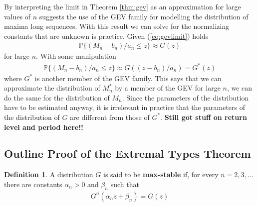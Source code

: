 \documentclass[a4paper,10pt]{article}
\theoremstyle{definition}
\newtheorem{defn}[thm]{Definition}
\numberwithin{equation}{section}
\begin{document}
By interpreting the limit in Theorem \ref{thm:gev} as an approximation for large values of $n$ suggests the use of the GEV family for modelling the distribution of maxima long sequences. With this result we can solve for the normalizing constants that are unknown is practice. Given (\ref{eq:gevlimit}) holds
\begin{align*}
\mathbb{P}\{(M_n-b_n)/a_n\leq z\} \approx G(z)
\end{align*}
for large $n$. With some manipulation 
\begin{align*}
\mathbb{P}\{(M_n-b_n)/a_n\leq z\} \approx G((z-b_n)/a_n) = G^\ast(z)
\end{align*}
where $G^\ast$ is another member of the GEV family. This says that we can approximate the distribution of $M_n^\ast$ by a member of the GEV for large $n$, we can do the same for the distribution of $M_n$. {\color{red} Since the parameters of the distribution have to be estimated anyway, it is irrelevant in practice that the parameters of the distribution of $G$ are different from those of $G^\ast$}. \textbf{Still got stuff on return level and period here!!}

\subsection{Outline Proof of the Extremal Types Theorem}

\begin{defn}
A distribution $G$ is said to be \textbf{max-stable} if, for every $n=2,3,\ldots$ there are constants $\alpha_n>0$ and $\beta_n$ such that
\begin{align*}
G^n(\alpha_nz+\beta_n) = G(z)
\end{align*}
\end{defn}
\end{document}
